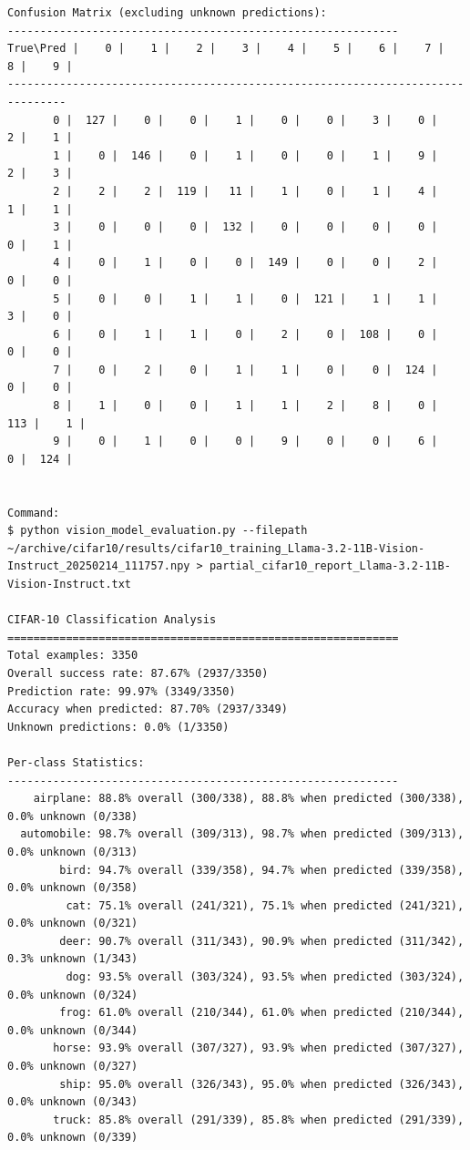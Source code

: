 \begin{verbatim}
Confusion Matrix (excluding unknown predictions):
------------------------------------------------------------
True\Pred |    0 |    1 |    2 |    3 |    4 |    5 |    6 |    7 |    8 |    9 |
-------------------------------------------------------------------------------
       0 |  127 |    0 |    0 |    1 |    0 |    0 |    3 |    0 |    2 |    1 |
       1 |    0 |  146 |    0 |    1 |    0 |    0 |    1 |    9 |    2 |    3 |
       2 |    2 |    2 |  119 |   11 |    1 |    0 |    1 |    4 |    1 |    1 |
       3 |    0 |    0 |    0 |  132 |    0 |    0 |    0 |    0 |    0 |    1 |
       4 |    0 |    1 |    0 |    0 |  149 |    0 |    0 |    2 |    0 |    0 |
       5 |    0 |    0 |    1 |    1 |    0 |  121 |    1 |    1 |    3 |    0 |
       6 |    0 |    1 |    1 |    0 |    2 |    0 |  108 |    0 |    0 |    0 |
       7 |    0 |    2 |    0 |    1 |    1 |    0 |    0 |  124 |    0 |    0 |
       8 |    1 |    0 |    0 |    1 |    1 |    2 |    8 |    0 |  113 |    1 |
       9 |    0 |    1 |    0 |    0 |    9 |    0 |    0 |    6 |    0 |  124 |


Command:
$ python vision_model_evaluation.py --filepath ~/archive/cifar10/results/cifar10_training_Llama-3.2-11B-Vision-Instruct_20250214_111757.npy > partial_cifar10_report_Llama-3.2-11B-Vision-Instruct.txt

CIFAR-10 Classification Analysis
============================================================
Total examples: 3350
Overall success rate: 87.67% (2937/3350)
Prediction rate: 99.97% (3349/3350)
Accuracy when predicted: 87.70% (2937/3349)
Unknown predictions: 0.0% (1/3350)

Per-class Statistics:
------------------------------------------------------------
    airplane: 88.8% overall (300/338), 88.8% when predicted (300/338), 0.0% unknown (0/338)
  automobile: 98.7% overall (309/313), 98.7% when predicted (309/313), 0.0% unknown (0/313)
        bird: 94.7% overall (339/358), 94.7% when predicted (339/358), 0.0% unknown (0/358)
         cat: 75.1% overall (241/321), 75.1% when predicted (241/321), 0.0% unknown (0/321)
        deer: 90.7% overall (311/343), 90.9% when predicted (311/342), 0.3% unknown (1/343)
         dog: 93.5% overall (303/324), 93.5% when predicted (303/324), 0.0% unknown (0/324)
        frog: 61.0% overall (210/344), 61.0% when predicted (210/344), 0.0% unknown (0/344)
       horse: 93.9% overall (307/327), 93.9% when predicted (307/327), 0.0% unknown (0/327)
        ship: 95.0% overall (326/343), 95.0% when predicted (326/343), 0.0% unknown (0/343)
       truck: 85.8% overall (291/339), 85.8% when predicted (291/339), 0.0% unknown (0/339)


\end{verbatim}
